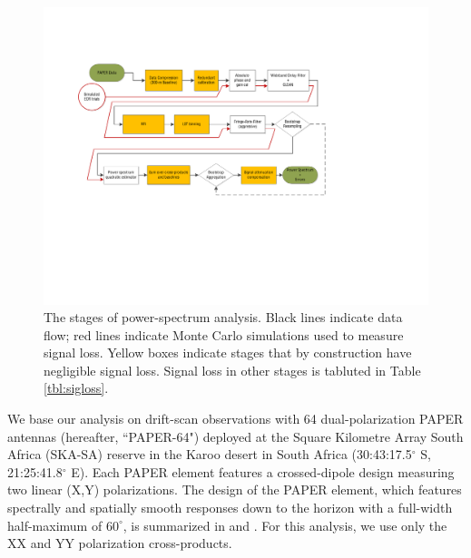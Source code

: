 \documentclass[twocolumn,numberedappendix]{emulateapj} \shorttitle{New Limits on the 21 cm Power Spectrum at $z=8.4$}
\begin{document}
\begin{figure}
\includegraphics[width=2\columnwidth,trim=0cm 7cm 5cm 2cm,clip]{plots/data_flow_chart.pdf}
\caption
{
The stages of power-spectrum analysis. Black lines indicate data flow; red lines indicate
Monte Carlo simulations used to 
measure signal loss. Yellow boxes indicate stages that by construction have negligible signal loss.
Signal loss in other stages is tabluted in Table \ref{tbl:sigloss}.
}
\label{fig:flowchart}
\end{figure}

We base our analysis on drift-scan observations 
with 64 dual-polarization PAPER antennas (hereafter, ``PAPER-64") deployed 
at the Square Kilometre Array South Africa
(SKA-SA) reserve in the Karoo desert in South Africa
(30:43:17.5$^\circ$ S, 21:25:41.8$^\circ$ E).
Each PAPER element features a crossed-dipole design measuring two
linear (X,Y) polarizations.
The design of the PAPER element, 
which features spectrally and spatially smooth responses 
down to the horizon with a full-width half-maximum of $60^{\circ}$, is summarized in \citet{parsons_et_al2010}
and \citet{pober_et_al2012}.  
For this analysis, we use only the XX and YY polarization cross-products.
\end{document}
